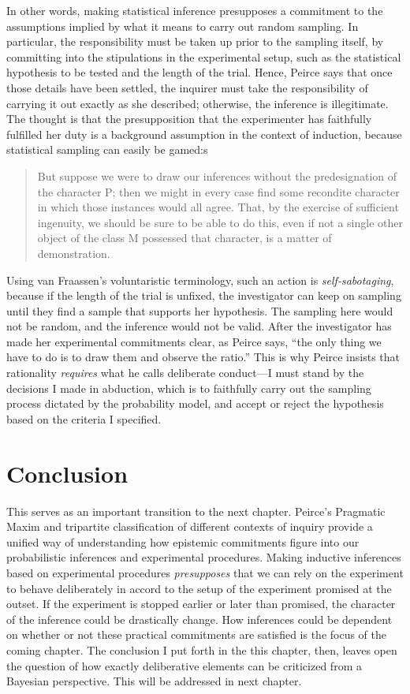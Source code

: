 In other words, making statistical inference presupposes a commitment to
the assumptions implied by what it means to carry out random sampling.
In particular, the responsibility must be taken up prior to the sampling
itself, by committing into the stipulations in the experimental setup,
such as the statistical hypothesis to be tested and the length of the
trial. Hence, Peirce says that once those details have been settled, the
inquirer must take the responsibility of carrying it out exactly as she
described; otherwise, the inference is illegitimate. The thought is that the presupposition that the experimenter has faithfully fulfilled her duty is a background assumption in the context of induction, because statistical sampling can easily be gamed:s

\begin{quote}
But suppose we were to draw our inferences without the predesignation of
the character P; then we might in every case find some recondite
character in which those instances would all agree. That, by the
exercise of sufficient ingenuity, we should be sure to be able to do
this, even if not a single other object of the class M possessed that
character, is a matter of demonstration.
\end{quote}

Using van Fraassen's voluntaristic terminology, such an action is
\emph{self-sabotaging}, because if the length of the trial is unfixed,
the investigator can keep on sampling until they find a sample that
supports her hypothesis. The sampling here would not be random, and the
inference would not be valid. After the investigator has made her
experimental commitments clear, as Peirce says, ``the only thing we have
to do is to draw them and observe the ratio.'' This is why Peirce
insists that rationality \emph{requires} what he calls deliberate
conduct---I must stand by the decisions I made in abduction, which is to
faithfully carry out the sampling process dictated by the probability
model, and accept or reject the hypothesis based on the criteria I
specified. 

\section{Conclusion}

This serves as an important transition to the next chapter. Peirce's Pragmatic Maxim and tripartite classification of different contexts of inquiry provide a unified way of understanding how epistemic commitments figure into our probabilistic inferences and experimental procedures. Making inductive inferences based on experimental procedures \emph{presupposes} that we can rely on the experiment to behave deliberately in accord to the setup of the experiment promised at the outset. If the experiment is stopped earlier or later than promised, the character of the inference could be drastically change. How inferences could be dependent on whether or not these practical commitments are satisfied is the focus of the coming chapter. The conclusion I put forth in the this chapter, then, leaves open the question of how exactly deliberative elements can be criticized from a Bayesian perspective. This will be addressed in next chapter.

